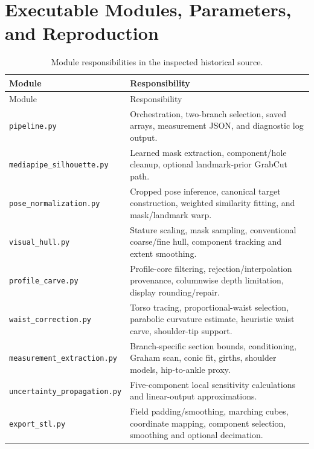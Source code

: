 \documentclass[11pt,a4paper]{article}
\numberwithin{equation}{section}
\begin{document}
\section{Executable Modules, Parameters, and Reproduction}
\label{app:reproduction}
\begin{longtable}{L{5.4cm}L{9.3cm}}
\caption{Module responsibilities in the inspected historical source.}\label{tab:modules}\\
\toprule
Module & Responsibility \\
\midrule
\endfirsthead
\toprule Module & Responsibility \\
\midrule
\endhead
\bottomrule\endfoot
\nolinkurl{pipeline.py} & Orchestration, two-branch selection, saved arrays, measurement JSON, and diagnostic log output. \\
\nolinkurl{mediapipe_silhouette.py} & Learned mask extraction, component/hole cleanup, optional landmark-prior GrabCut path. \\
\nolinkurl{pose_normalization.py} & Cropped pose inference, canonical target construction, weighted similarity fitting, and mask/landmark warp. \\
\nolinkurl{visual_hull.py} & Stature scaling, mask sampling, conventional coarse/fine hull, component tracking and extent smoothing. \\
\nolinkurl{profile_carve.py} & Profile-core filtering, rejection/interpolation provenance, columnwise depth limitation, display rounding/repair. \\
\nolinkurl{waist_correction.py} & Torso tracing, proportional-waist selection, parabolic curvature estimate, heuristic waist carve, shoulder-tip support. \\
\nolinkurl{measurement_extraction.py} & Branch-specific section bounds, conditioning, Graham scan, conic fit, girths, shoulder models, hip-to-ankle proxy. \\
\nolinkurl{uncertainty_propagation.py} & Five-component local sensitivity calculations and linear-output approximations. \\
\nolinkurl{export_stl.py} & Field padding/smoothing, marching cubes, coordinate mapping, component selection, smoothing and optional decimation. \\
\end{longtable}
\end{document}
